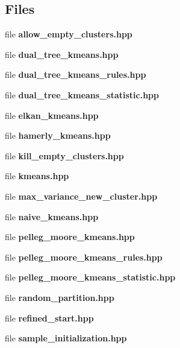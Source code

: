 \subsection*{Files}
\begin{DoxyCompactItemize}
\item 
file {\bf allow\+\_\+empty\+\_\+clusters.\+hpp}
\item 
file {\bf dual\+\_\+tree\+\_\+kmeans.\+hpp}
\item 
file {\bf dual\+\_\+tree\+\_\+kmeans\+\_\+rules.\+hpp}
\item 
file {\bf dual\+\_\+tree\+\_\+kmeans\+\_\+statistic.\+hpp}
\item 
file {\bf elkan\+\_\+kmeans.\+hpp}
\item 
file {\bf hamerly\+\_\+kmeans.\+hpp}
\item 
file {\bf kill\+\_\+empty\+\_\+clusters.\+hpp}
\item 
file {\bf kmeans.\+hpp}
\item 
file {\bf max\+\_\+variance\+\_\+new\+\_\+cluster.\+hpp}
\item 
file {\bf naive\+\_\+kmeans.\+hpp}
\item 
file {\bf pelleg\+\_\+moore\+\_\+kmeans.\+hpp}
\item 
file {\bf pelleg\+\_\+moore\+\_\+kmeans\+\_\+rules.\+hpp}
\item 
file {\bf pelleg\+\_\+moore\+\_\+kmeans\+\_\+statistic.\+hpp}
\item 
file {\bf random\+\_\+partition.\+hpp}
\item 
file {\bf refined\+\_\+start.\+hpp}
\item 
file {\bf sample\+\_\+initialization.\+hpp}
\end{DoxyCompactItemize}
